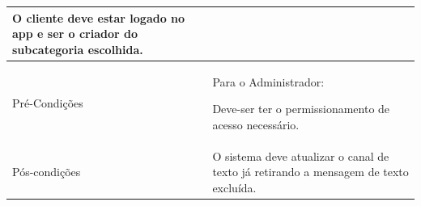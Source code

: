 \begin{landscape}
\begin{longtable}{|p{3.3cm}|p{10.3cm}|}
		O cliente deve estar logado no app e ser o criador do subcategoria escolhida.\\
		\hline
		Pré-Condições & Para o Administrador:
		
		Deve-ser ter o permissionamento de acesso necessário.\\
		\hline
		Pós-condições & O sistema deve atualizar o canal de texto já retirando a mensagem de texto excluída.\\
		\hline
	\end{longtable}
\end{landscape}
